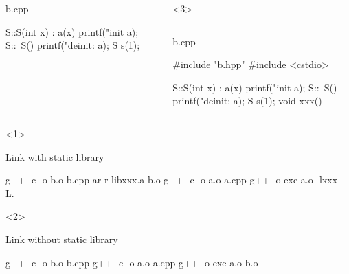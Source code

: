 \documentclass[UTF8,lualatex]{ctexbeamer}
\begin{document}
\begin{frame}[fragile,t]
\begin{columns}[t]
\begin{onlyenv}
\begin{column}{0.33\textwidth}
\begin{block}{b.cpp}
\begin{cppcode}
                    S::S(int x) : a(x) {
                    printf("init %
                        a);
                    }
                    S::~S() {
                    printf("deinit: %
                        a);
                    }
                    S s(1);
                    \end{cppcode}
                \end{block}
            \end{column}
        \end{onlyenv}
        \begin{onlyenv}<3>
            \begin{column}{0.33\textwidth}
                \begin{block}{b.cpp}
                    \begin{cppcode}
                    #include "b.hpp"
                    #include <cstdio>

                    S::S(int x) : a(x) {
                    printf("init %
                        a);
                    }
                    S::~S() {
                    printf("deinit: %
                        a);
                    }
                    S s(1);
                    void xxx() {}
                    \end{cppcode}
                \end{block}
            \end{column}
        \end{onlyenv}
    \end{columns}
    \begin{onlyenv}<1>
        \begin{block}{Link with static library}
            \begin{bashcode}
                g++ -c -o b.o b.cpp
                ar r libxxx.a b.o
                g++ -c -o a.o a.cpp
                g++ -o exe a.o -lxxx -L.
            \end{bashcode}
        \end{block}
    \end{onlyenv}
    \begin{onlyenv}<2>
        \begin{block}{Link without static library}
            \begin{bashcode}
                g++ -c -o b.o b.cpp
                g++ -c -o a.o a.cpp
                g++ -o exe a.o b.o
            \end{bashcode}
        \end{block}
    \end{onlyenv}
\end{frame}
\end{document}
